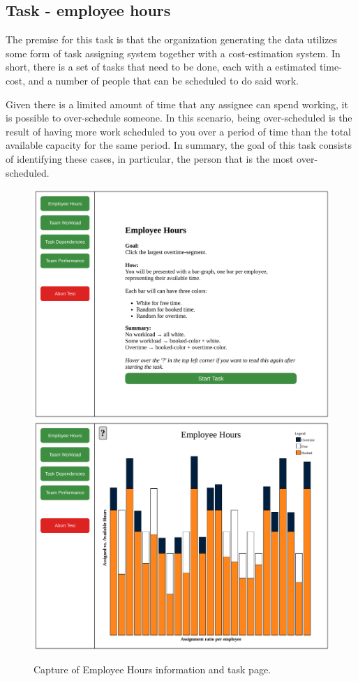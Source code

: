\documentclass[nofilelist,dvipsnames]{cslthse-msc}
\begin{document}
{      %

      \subsection{Task - employee hours}

        \textit{\ideaOne}

        The premise for this task is that the organization generating the data
        utilizes some form of task assigning system together with a
        cost-estimation system. In short, there is a set of tasks that need to
        be done, each with a estimated time-cost, and a number of people that
        can be scheduled to do said work.

        Given there is a limited amount of time that any assignee can spend
        working, it is possible to over-schedule someone. In this scenario,
        being over-scheduled is the result of having more work scheduled to you
        over a period of time than the total available capacity for the same
        period. In summary, the goal of this task consists of identifying these
        cases, in particular, the person that is the most over-scheduled.

        \begin{figure}[h!]
          \centering
          \includegraphics[width=.49\textwidth]{figures/captures/webapp_employee_hours_info.pdf}
          \includegraphics[width=.49\textwidth]{figures/captures/webapp_employee_hours_task.pdf}
          \caption{Capture of Employee Hours information and task page.}
        \end{figure}

}
\end{document}
